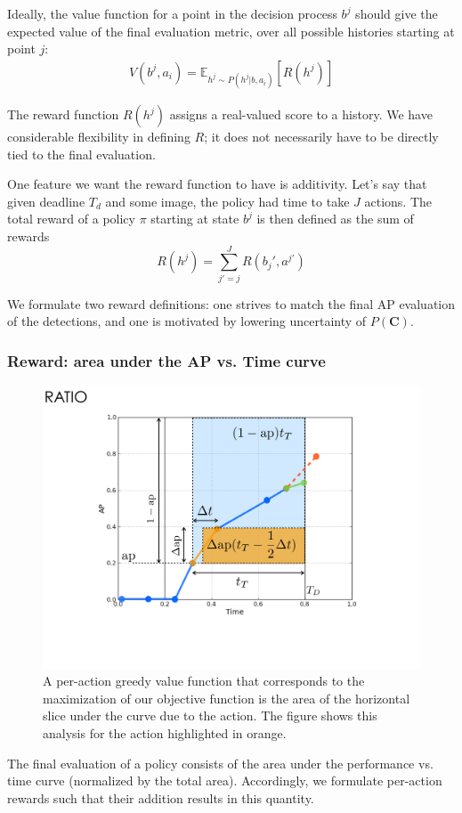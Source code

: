 Ideally, the value function for a point in the decision process $b^j$ should give the expected value of the final evaluation metric, over all possible histories starting at point $j$:
\begin{align}
V(b^j,a_i) = \mathbb{E}_{h^j \sim P(h^j|b,a_i)}[R(h^j)]
\end{align}

The reward function $R(h^j)$ assigns a real-valued score to a history.
We have considerable flexibility in defining $R$; it does not necessarily have to be directly tied to the final evaluation.

One feature we want the reward function to have is additivity.
Let's say that given deadline $T_d$ and some image, the policy had time to take $J$ actions.
The total reward of a policy $\pi$ starting at state $b^j$ is then defined as the sum of rewards
\begin{equation}
R(h^j) = \sum_{j'=j}^J R(b_j',a^{j'})
\end{equation}

We formulate two reward definitions: one strives to match the final AP evaluation of the detections, and one is motivated by lowering uncertainty of $P(\mathbf{C})$.

\subsubsection{Reward: area under the AP vs. Time curve}
\begin{figure}[htb]
  \centering
  \includegraphics[width=0.56\linewidth]{../figures/apvst_expl.pdf}
  \caption{A per-action greedy value function that corresponds to the maximization of our objective function is the area of the horizontal slice under the curve due to the action. The figure shows this analysis for the action highlighted in orange.}
  \label{fig:rewards}
\end{figure}

The final evaluation of a policy consists of the area under the performance vs. time curve (normalized by the total area).
Accordingly, we formulate per-action rewards such that their addition results in this quantity.

